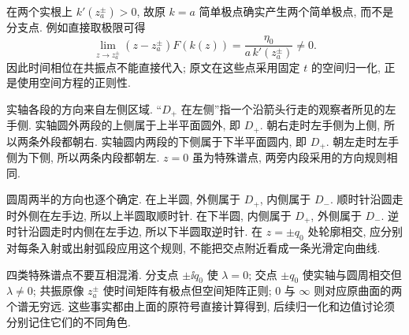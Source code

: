 在两个实根上 $k'(z_a^\pm)>0$, 故原 $k=a$ 简单极点确实产生两个简单极点, 而不是分支点. 例如直接取极限可得
\begin{equation*}
\lim\limits_{z\to z_a^\pm}(z-z_a^\pm)F(k(z))
=\dfrac{\eta_0}{a\,k'(z_a^\pm)}\ne0.
\end{equation*}
因此时间相位在共振点不能直接代入; 原文在这些点采用固定 $t$ 的空间归一化, 正是使用空间方程的正则性.
\par\smallskip\noindent 实轴各段的方向来自左侧区域.\quad
``$D_+$ 在左侧''指一个沿箭头行走的观察者所见的左手侧. 实轴圆外两段的上侧属于上半平面圆外, 即 $D_+$. 朝右走时左手侧为上侧, 所以两条外段都朝右. 实轴圆内两段的下侧属于下半平面圆内, 即 $D_+$. 朝左走时左手侧为下侧, 所以两条内段都朝左. $z=0$ 虽为特殊谱点, 两旁内段采用的方向规则相同.
\par\smallskip\noindent 圆周两半的方向也逐个确定.\quad
在上半圆, 外侧属于 $D_+$, 内侧属于 $D_-$. 顺时针沿圆走时外侧在左手边, 所以上半圆取顺时针. 在下半圆, 内侧属于 $D_+$, 外侧属于 $D_-$. 逆时针沿圆走时内侧在左手边, 所以下半圆取逆时针. 在 $z=\pm q_0$ 处轮廓相交, 应分别对每条入射或出射弧段应用这个规则, 不能把交点附近看成一条光滑定向曲线.
\par\smallskip\noindent 四类特殊谱点不要互相混淆.\quad
分支点 $\pm\ii q_0$ 使 $\lambda=0$; 交点 $\pm q_0$ 使实轴与圆周相交但 $\lambda\ne0$; 共振原像 $z_a^\pm$ 使时间矩阵有极点但空间矩阵正则; $0$ 与 $\infty$ 则对应原曲面的两个谱无穷远. 这些事实都由上面的原符号直接计算得到, 后续归一化和边值讨论须分别记住它们的不同角色.
